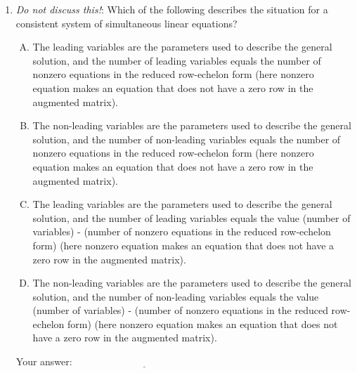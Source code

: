 \documentclass[10pt]{amsart}
\begin{document}
\begin{enumerate}
\item {\em Do not discuss this!}: Which of the following describes the
  situation for a consistent system of simultaneous linear equations?

  \begin{enumerate}[(A)]
  \item The leading variables are the parameters used to describe the
    general solution, and the number of leading variables equals the
    number of nonzero equations in the reduced row-echelon form (here
    nonzero equation makes an equation that does not have a zero row
    in the augmented matrix).
  \item The non-leading variables are the parameters used to describe the
    general solution, and the number of non-leading variables equals the
    number of nonzero equations in the reduced row-echelon form (here
    nonzero equation makes an equation that does not have a zero row
    in the augmented matrix).
  \item The leading variables are the parameters used to describe the
    general solution, and the number of leading variables equals the
    value (number of variables) - (number of nonzero equations in the
    reduced row-echelon form) (here nonzero equation makes an equation
    that does not have a zero row in the augmented matrix).
  \item The non-leading variables are the parameters used to describe
    the general solution, and the number of non-leading variables
    equals the value (number of variables) - (number of nonzero equations
    in the reduced row-echelon form) (here nonzero equation makes an
    equation that does not have a zero row in the augmented matrix).
  \end{enumerate}

  \vspace{0.1in}
  Your answer: $\underline{\qquad\qquad\qquad\qquad\qquad\qquad\qquad}$
  \vspace{0.1in}

\end{enumerate}
\end{document}
